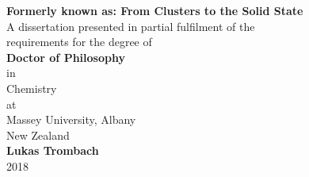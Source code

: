 
\begin{titlepage}
\begin{center}
\vspace*{10mm}
    \LARGE{\textbf{Formerly known as: From Clusters to the Solid State
    }}\\\vspace{2cm}
    \large{
    A dissertation presented in partial fulfilment of the \\ requirements for the degree of 
    }\\\vspace{2cm}
    \large{\textbf{
    Doctor of Philosophy
    }}\\
	\large{in \\ Chemistry}\\\vspace{2cm}
    \large{at \\ Massey University, Albany \\ New Zealand}\\\vspace{2cm}
    \large{\textbf{Lukas Trombach}}\\\vspace{1.5cm}
    \large{2018}
    
\end{center}
\end{titlepage}
